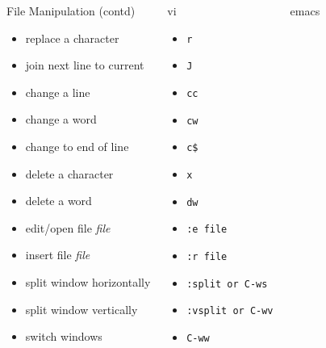 \documentclass[c,compress,xcolor=svgnames]{beamer}
\newenvironment{eblock}[0]
{
\begin{beamerboxesrounded}[upper=uppercol2,lower=lowercol2,shadow=true]}
{\end{beamerboxesrounded}}
\begin{document}
\begin{frame}[allowframebreaks]
  {\scriptsize
  \begin{columns}
     \vspace{-0.5cm}
    \begin{eblock}{File Manipulation (contd)}
    \begin{itemize}
      \item replace a character
      \item join next line to current
      \item change a line
      \item change a word
      \item change to end of line
      \item delete a character
      \item delete a word
      \item edit/open file \textit{file}
      \item insert file \textit{file}
      \item split window horizontally
      \item split window vertically
      \item switch windows
    \end{itemize}
    \end{eblock}
     \vspace{-0.5cm}
    \begin{eblock}{vi}
    \begin{itemize}
      \item \texttt{r}
      \item \texttt{J}
      \item \texttt{cc}
      \item \texttt{cw}
      \item \texttt{c\$}
      \item \texttt{x}
      \item \texttt{dw}
      \item \texttt{:e \texttt{file}}
      \item \texttt{:r \texttt{file}}
      \item \texttt{:split or C-ws}
      \item \texttt{:vsplit or C-wv}
      \item \texttt{C-ww}
    \end{itemize}
    \end{eblock}
     \vspace{-0.5cm}
    \begin{eblock}{emacs}

\end{eblock}
\end{columns}}
\end{frame}
\end{document}
